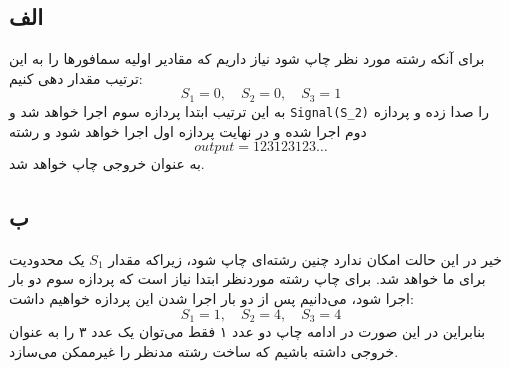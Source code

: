 \subsection*{الف}
برای آنکه رشته مورد نظر چاپ شود نیاز داریم که مقادیر اولیه سمافورها را به این ترتیب مقدار دهی کنیم:
\[
    S_1 = 0, \quad S_2 = 0, \quad S_3 = 1    
\]
به این ترتیب ابتدا پردازه سوم اجرا خواهد شد و
\verb|Signal(S_2)|
را صدا زده و پردازه دوم اجرا شده و در نهایت پردازه اول اجرا خواهد شود و رشته
\[
    output = 123123123 \dots  
\]
به عنوان خروجی چاپ خواهد شد.

\subsection*{ب}
خیر در این حالت امکان ندارد چنین رشته‌ای چاپ شود، زیراکه مقدار
$S_1$
یک محدودیت برای ما خواهد شد. برای چاپ رشته موردنظر ابتدا نیاز است که پردازه سوم دو بار اجرا شود، می‌دانیم پس از دو بار اجرا شدن این پردازه خواهیم داشت:
\[
    S_1 = 1, \quad S_2 = 4, \quad S_3 = 4
\]
بنابراین در این صورت در ادامه چاپ دو عدد ۱ فقط می‌توان یک عدد ۳ را به عنوان خروجی داشته باشیم که ساخت رشته مدنظر را غیرممکن می‌سازد.